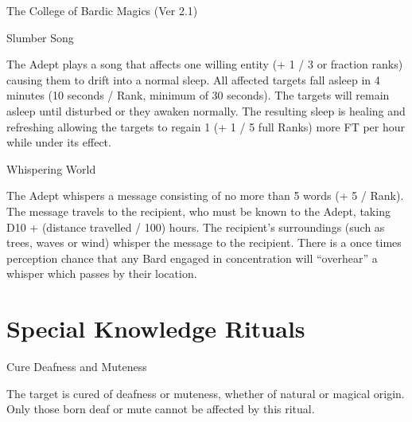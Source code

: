\begin{Chapter}{The College of Bardic Magics (Ver 2.1)}
\begin{spell}[S-13]{Slumber Song}

\begin{effects}
The Adept plays a song that affects one willing entity (+ 1 / 3 or
fraction ranks) causing them to drift into a normal sleep.  All
affected targets fall asleep in 4 minutes (10 seconds / Rank, minimum
of 30 seconds).  The targets will remain asleep until disturbed or
they awaken normally.  The resulting sleep is healing and refreshing
allowing the targets to regain 1 (+ 1 / 5 full Ranks) more FT per
hour while under its effect.
\end{effects}
\end{spell}

\begin{spell}[S-14]{Whispering World}

\begin{effects}
The Adept whispers a message consisting of no more than 5 words (+ 5 /
Rank). The message travels to the recipient, who must be known to the
Adept, taking D10 + (distance travelled / 100) hours.  The recipient’s
surroundings (such as trees, waves or wind) whisper the message to the
recipient.  There is a once times perception chance that any Bard
engaged in concentration will “overhear” a whisper which passes by
their location.
\end{effects}
\end{spell}


\section{Special Knowledge Rituals}

\begin{ritual}[R-1]{Cure Deafness and Muteness}

\begin{effects}
The target is cured of deafness or muteness, whether of natural or
magical origin.  Only those born deaf or mute cannot be affected by
this ritual.
\end{effects}
\end{ritual}


\end{Chapter}

